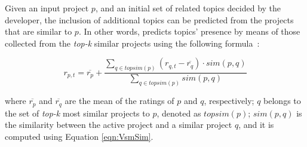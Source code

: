 



Given an input project $p$, and an initial set of related topics decided by the 
developer, the inclusion 
of 
additional topics can be predicted from the projects that are similar to $p$. 
In other words, \TF predicts topics' presence by means of those collected from 
the \emph{top-k} similar projects using the following 
formula~\cite{NGUYEN2020110460}:

\begin{equation} \label{eqn:Prediction}
r_{p,t}=\overline{r_{p}}+\frac{\sum_{q \in topsim(p)}(r_{q,t}-\overline{r_{q}})\cdot sim(p,q) }{\sum_{q \in topsim(p)} sim(p,q) } %
\end{equation}

\noindent
where $\overline{r_{p}}$ and $\overline{r_{q}}$ are the mean of the ratings of $p$ and $q$, respectively; $q$ belongs to the set of \emph{top-k} most similar projects to $p$, denoted as $topsim(p)$; $sim(p,q)$ is the similarity between the active project and a similar project $q$, and it is computed using Equation \ref{eqn:VsmSim}. %





